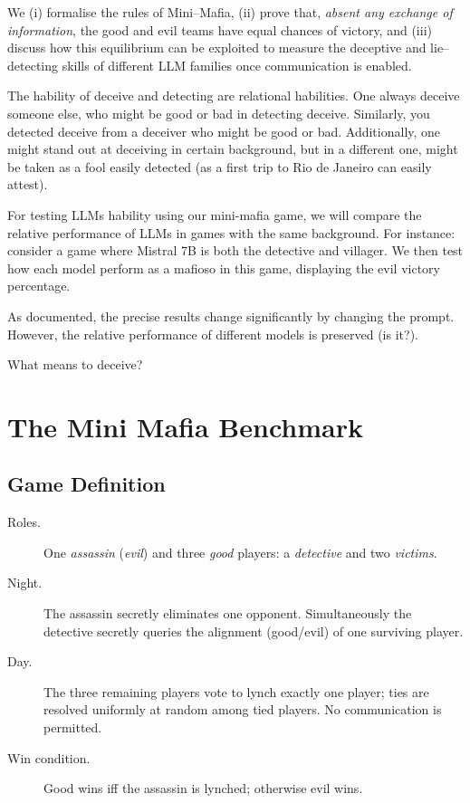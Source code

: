 \documentclass{article}
\begin{document}
We (i) formalise the rules of Mini--Mafia, (ii) prove that, \emph{absent any exchange of information}, the good and evil teams have equal chances of victory, and (iii) discuss how this equilibrium can be exploited to measure the deceptive and lie--detecting skills of different LLM families once communication is enabled.



The hability of deceive and detecting are relational habilities. One always deceive someone else, who might be good or bad in detecting deceive. Similarly, you detected deceive from a deceiver who might be good or bad. Additionally, one might stand out at deceiving in certain background, but in a different one, might be taken as a fool easily detected (as a first trip to Rio de Janeiro can easily attest).

For testing LLMs hability using our mini-mafia game, we will compare the relative performance of LLMs in games with the same background. For instance: consider a game where Mistral 7B is both the detective and villager. We then test how each model perform as a mafioso in this game, displaying the evil victory percentage.

As documented, the precise results change significantly by changing the prompt. However, the relative performance of different models is preserved (is it?). 



What means to deceive? 



\section{The Mini Mafia Benchmark}



\subsection{Game Definition}

\begin{description}
  \item[Roles.] One \emph{assassin} (\emph{evil}) and three \emph{good} players: a \emph{detective} and two \emph{victims}.
  \item[Night.] The assassin secretly eliminates one opponent.  Simultaneously the detective secretly queries the alignment (good/evil) of one surviving player.
  \item[Day.] The three remaining players vote to lynch exactly one player; ties are resolved uniformly at random among tied players.  No communication is permitted.
  \item[Win condition.]  Good wins iff the assassin is lynched; otherwise evil wins.
\end{description}
\end{document}
